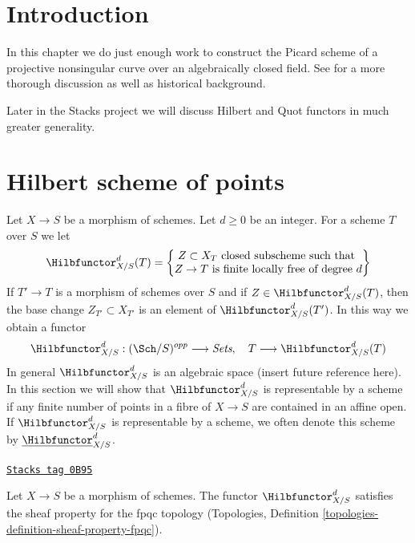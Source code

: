 \section{Introduction}
\label{pic-section-introduction}
In this chapter we do just enough work to construct the Picard scheme
of a projective nonsingular curve over an algebraically closed field.
See \cite{Kleiman-Picard} for a more thorough discussion as well as
historical background.

\medskip\noindent
Later in the Stacks project we will discuss Hilbert and Quot functors
in much greater generality.

\section{Hilbert scheme of points}
\label{pic-section-hilbert-scheme-points}
Let $X \to S$ be a morphism of schemes. Let $d \geq 0$ be an integer.
For a scheme $T$ over $S$ we let
$$
\Hilbfunctor^d_{X/S}(T) =
\left\{
\begin{matrix}
Z \subset X_T\text{ closed subscheme such that }\\
Z \to T\text{ is finite locally free of degree }d
\end{matrix}
\right\}
$$
If $T' \to T$ is a morphism of schemes over $S$ and if
$Z \in \Hilbfunctor^d_{X/S}(T)$, then the base change
$Z_{T'} \subset X_{T'}$ is an element of $\Hilbfunctor^d_{X/S}(T')$.
In this way we obtain a functor
$$
\Hilbfunctor^d_{X/S} :
(\Sch/S)^{opp} \longrightarrow \textit{Sets},\quad
T \longrightarrow \Hilbfunctor^d_{X/S}(T)
$$
In general $\Hilbfunctor^d_{X/S}$ is an algebraic space
(insert future reference here). In this section we will
show that $\Hilbfunctor^d_{X/S}$ is representable
by a scheme if any finite number of points in a fibre of
$X \to S$ are contained in an affine open.
If $\Hilbfunctor^d_{X/S}$ is representable by a scheme, we often
denote this scheme by $\underline{\Hilbfunctor}^d_{X/S}$.

\begin{lemma}
\label{pic-lemma-hilb-d-sheaf}
\href{https://stacks.math.columbia.edu/tag/0B95}{\texttt{Stacks tag 0B95}}

Let $X \to S$ be a morphism of schemes. The functor $\Hilbfunctor^d_{X/S}$
satisfies the sheaf property for the fpqc topology
(Topologies, Definition \ref{topologies-definition-sheaf-property-fpqc}).
\end{lemma}

